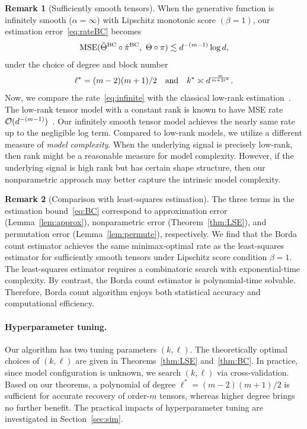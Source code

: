 \documentclass[12pt]{article}
\theoremstyle{definition}
\newtheorem{rmk}{Remark}
\begin{document}
\begin{rmk}[Sufficiently smooth tensors] When the generative function is infinitely smooth ($\alpha =\infty$) with Lipschitz monotonic score $(\beta=1)$,
our estimation error~\eqref{eq:rateBC} becomes
\begin{equation}\label{eq:infinite}
\textup{MSE}(\hat\Theta^{\textup{BC}}\circ\hat\pi^{\textup{BC}},\ \Theta\circ\pi)\lesssim d^{-(m-1)}\log d,
\end{equation}
under the choice of degree and block number
\[
\ell^*= {(m-2)(m+1)/2}\quad \text{and}\quad k^* \asymp d^{m\over m +2\ell^*}.
\]
Now, we compare the rate~\eqref{eq:infinite} with the classical low-rank estimation~\citep{wang2018learning,zhang2018tensor,kolda2009tensor}. The low-rank tensor model with a constant rank is known to have MSE rate $\mathcal{O}(d^{-(m-1)})$~\citep{wang2018learning}. Our infinitely smooth tensor model achieves the nearly same rate up to the negligible log term. Compared to low-rank models, we utilize a different measure of \emph{model complexity}.
When the underlying signal is precisely low-rank, then rank might be a reasonable measure for model complexity. However, if the underlying signal is high rank but has certain shape structure, then our nonparametric approach may better capture the intrinsic model complexity. 
\end{rmk}

\begin{rmk}[Comparison with least-squares estimation] The three terms in the estimation bound~\eqref{eq:BC} correspond to approximation error (Lemma~\ref{lem:approx}), nonparametric error (Theorem~\ref{thm:LSE}), and permutation error (Lemma~\ref{lem:permute}), respectively. 
We find that the Borda count estimator achieves the same minimax-optimal rate as the least-squares estimator for sufficiently smooth tensors under Lipschitz score condition $\beta =1$. The least-squares estimator requires a combinatoric search with exponential-time complexity. By contrast, the Borda count estimator is polynomial-time solvable. Therefore, Borda count algorithm enjoys both statistical accuracy and computational efficiency. 
\end{rmk}


\paragraph{Hyperparameter tuning.}
Our algorithm has two tuning parameters $(k,\ell)$. The theoretically optimal choices of $(k,\ell)$ are given in Theorems~\ref{thm:LSE} and~\ref{thm:BC}. In practice, since model configuration is unknown, we search $(k,\ell)$ via cross-validation. 
Based on our theorems, a polynomial of degree $\ell^*=(m-2)(m+1)/2$ is sufficient for accurate recovery of order-$m$ tensors, whereas higher degree brings no further benefit. The practical impacts of hyperparameter tuning are investigated in Section~\ref{sec:sim}. 
\end{document}
